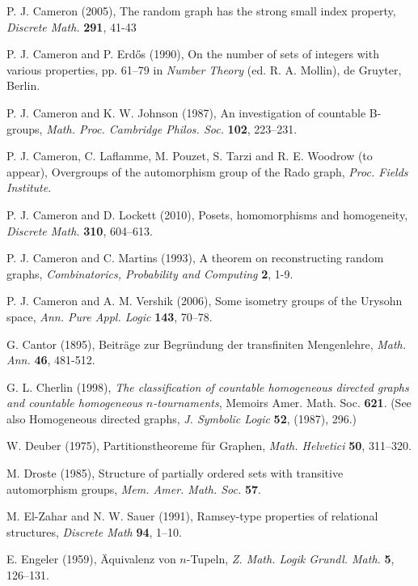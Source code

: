\documentclass[12pt]{article}
\begin{document}
\begin{thebibliography}{99}
P. J. Cameron (2005),
The random graph has the strong small index property,
\textit{Discrete Math.} \textbf{291}, 41-43

 P. J. Cameron and P. Erd\H{o}s (1990), On the number of sets of integers with
various properties, pp. 61--79 in \textit{Number Theory} (ed. R. A.
Mollin), de Gruyter, Berlin.

 P. J. Cameron and K. W. Johnson (1987), An investigation of countable B-groups, \textit{Math. Proc. Cambridge Philos. Soc.} \textbf{102}, 223--231.

P. J. Cameron, C. Laflamme, M. Pouzet, S. Tarzi and R. E. Woodrow (to appear),
Overgroups of the automorphism group of the Rado graph,
\textit{Proc. Fields Institute}.

P. J. Cameron and D. Lockett (2010),
Posets, homomorphisms and homogeneity,
\textit{Discrete Math.} \textbf{310}, 604--613.

P. J. Cameron and C. Martins (1993),
A theorem on reconstructing random graphs,
\textit{Combinatorics, Probability and Computing} \textbf{2}, 1-9.

P. J. Cameron and A. M. Vershik (2006),
Some isometry groups of the Urysohn space,
\textit{Ann. Pure Appl. Logic} \textbf{143}, 70--78.

G. Cantor (1895),
Beitr\"{a}ge zur Begr\"{u}ndung der transfiniten Mengenlehre,
\textit{Math. Ann.} \textbf{46}, 481-512.

G. L. Cherlin (1998),
\textit{The classification of countable homogeneous directed graphs and
countable homogeneous $n$-tournaments},
Memoirs Amer. Math. Soc. \textbf{621}.
(See also Homogeneous directed graphs, \textit{J. Symbolic Logic} \textbf{52},
(1987), 296.)

W. Deuber (1975),
Partitionstheoreme f\"{u}r Graphen,
\textit{Math. Helvetici} \textbf{50}, 311--320.

M. Droste (1985),
Structure of partially ordered sets with transitive automorphism groups,
\textit{Mem. Amer. Math. Soc.} \textbf{57}.

M. El-Zahar and N. W. Sauer (1991),
Ramsey-type properties of relational structures,
\textit{Discrete Math} \textbf{94}, 1--10.

E. Engeler (1959),
\"{A}quivalenz von $n$-Tupeln,
\textit{Z. Math. Logik Grundl. Math.} \textbf{5}, 126--131.


\end{thebibliography}
\end{document}
